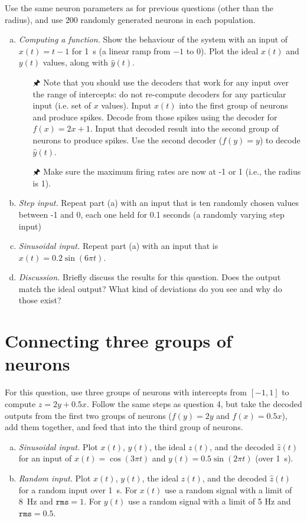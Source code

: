	Use the same neuron parameters as for previous questions (other than the radius), and use $200$ randomly generated neurons in each population.

	\begin{enumerate}[a)]
		\item {} \emph{Computing a function.} Show the behaviour of the system with an input of $x(t)=t-1$ for \SI{1}{\second} (a linear ramp from $-1$ to $0$). Plot the ideal $x(t)$ and $y(t)$ values, along with $\hat{y}(t)$.
		\begin{itemize}
			\item[\symbolfont 🖈] Note that you should use the decoders that work for any input over the range of intercepts: do not re-compute decoders for any particular input (i.e. set of $x$ values).
			Input $x(t)$ into the first group of neurons and produce spikes. Decode from those spikes using the decoder for $f(x)=2x+1$. Input that decoded result into the second group of neurons to produce spikes. Use the second decoder ($f(y)=y$) to decode $\hat{y}(t)$.
			\item[\symbolfont 🖈] Make sure the maximum firing rates are now at -1 or 1 (i.e., the radius is 1).
		\end{itemize}
		\item {} \emph{Step input.} Repeat part (a) with an input that is ten randomly chosen values between -1 and 0, each one held for 0.1 seconds (a randomly varying step input)
		\item {} \emph{Sinusoidal input.} Repeat part (a) with an input that is $x(t)=0.2\sin(6\pi t)$.
		\item {} \emph{Discussion.} Briefly discuss the results for this question. Does the output match the ideal output? What kind of deviations do you see and why do those exist?
	\end{enumerate}

	\section{Connecting three groups of neurons}
		
	For this question, use three groups of neurons with intercepts from $[-1, 1]$ to compute $z = 2y+0.5x$. Follow the same steps as question 4, but take the decoded outputs from the first two groups of neurons ($f(y)=2y$ and $f(x)=0.5x$), add them together, and feed that into the third group of neurons.

	\begin{enumerate}[a)]
		\item {} \emph{Sinusoidal input.} Plot $x(t)$, $y(t)$, the ideal $z(t)$, and the decoded $\hat{z}(t)$ for an input of $x(t)=\cos(3\pi t)$ and $y(t)=0.5 \sin (2 \pi t)$ (over \SI{1}{\second}).
		\item {} \emph{Random input.} Plot $x(t)$, $y(t)$, the ideal $z(t)$, and the decoded $\hat{z}(t)$ for a random input over \SI{1}{\second}. For $x(t)$ use a random signal with a limit of \SI{8}{\hertz} and $\mathtt{rms}=1$. For $y(t)$ use a random signal with a limit of 5 Hz and $\mathtt{rms}=0.5$.
	\end{enumerate}


